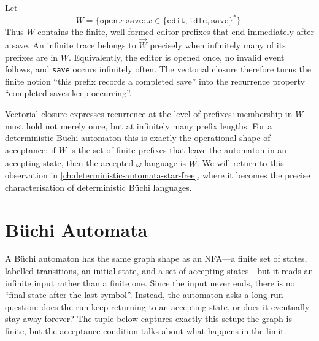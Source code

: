 \begin{example}
\label{ex:vectorial-closure-save}
Let
\[
  W=\{\texttt{open}\,x\,\texttt{save} :
       x\in\{\texttt{edit},\texttt{idle},\texttt{save}\}^*\}.
\]
Thus $W$ contains the finite, well-formed editor prefixes that end
immediately after a save.  An infinite trace belongs to
$\overrightarrow{W}$ precisely when infinitely many of its prefixes are
in $W$.  Equivalently, the editor is opened once, no invalid event follows,
and \texttt{save} occurs infinitely often.  The vectorial closure therefore
turns the finite notion ``this prefix records a completed save'' into the
recurrence property ``completed saves keep occurring''.
\end{example}

Vectorial closure expresses recurrence at the level of prefixes: membership
in $W$ must hold not merely once, but at infinitely many prefix lengths.
For a deterministic B\"uchi automaton this is exactly the operational
shape of acceptance: if $W$ is the set of finite prefixes that leave the
automaton in an accepting state, then the accepted $\omega$-language is
$\overrightarrow{W}$.  We will return to this observation in
\cref{ch:deterministic-automata-star-free}, where it becomes the precise
characterisation of deterministic B\"uchi languages.


\section{B\"uchi Automata}
\label{sec:buchi-automata}

A B\"uchi automaton has the same graph shape as an NFA---a finite set of
states, labelled transitions, an initial state, and a set of accepting
states---but it reads an infinite input rather than a finite one.  Since
the input never ends, there is no ``final state after the last symbol''.
Instead, the automaton asks a long-run question: does the run keep
returning to an accepting state, or does it eventually stay away
forever?  The tuple below captures exactly this setup: the graph is
finite, but the acceptance condition talks about what happens in the
limit.

